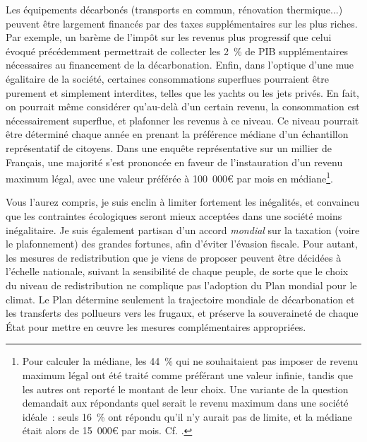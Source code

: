 \documentclass[a5paper,french]{memoir}
\begin{document}
Les équipements décarbonés (transports en commun, rénovation thermique...) peuvent être largement financés par des taxes supplémentaires sur les plus riches. Par exemple, un barème de l'impôt sur les revenus %
plus progressif que celui évoqué précédemment permettrait de collecter les 2~\% de PIB supplémentaires nécessaires au financement de la décarbonation. 
Enfin, dans l'optique d'une mue égalitaire de la société, certaines consommations superflues pourraient être purement et simplement interdites, telles que les yachts ou les jets privés. En fait, on pourrait même considérer qu'au-delà d'un certain revenu, la consommation est nécessairement superflue, et plafonner les revenus à ce niveau. Ce niveau pourrait être déterminé chaque année en prenant la préférence médiane d'un échantillon représentatif de citoyens. Dans une enquête représentative sur un millier de Français, une majorité s'est prononcée en faveur de l'instauration d'un revenu maximum légal, avec une valeur préférée à 100~000\euro{} par mois en médiane\footnote{Pour calculer la médiane, les 44~\% qui ne souhaitaient pas imposer de revenu maximum légal ont été traité comme préférant une valeur infinie, tandis que les autres ont reporté le montant de leur choix. Une variante de la question demandait aux répondants quel serait le revenu maximum dans une société idéale~: seuls 16~\% ont répondu qu'il n'y aurait pas de limite, et la médiane était alors de 15~000\euro{} par mois. Cf. \cite{fabre_determiner_2022}.}. 

Vous l'aurez compris, je suis enclin à limiter fortement les inégalités, et convaincu que les contraintes écologiques seront mieux acceptées dans une société moins inégalitaire. Je suis également partisan d'un accord \textit{mondial} sur la taxation (voire le plafonnement) des grandes fortunes, afin d'éviter l'évasion fiscale. Pour autant, les mesures de redistribution que je viens de proposer peuvent être décidées à l'échelle nationale, suivant la sensibilité de chaque peuple, de sorte que le choix du niveau de redistribution ne complique pas l'adoption du Plan mondial pour le climat. Le Plan détermine seulement la trajectoire mondiale de décarbonation et les transferts des pollueurs vers les frugaux, et préserve la souveraineté de chaque État pour mettre en œuvre les mesures complémentaires appropriées.
\end{document}
